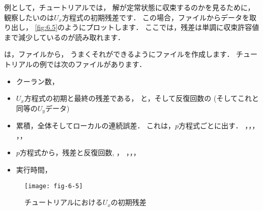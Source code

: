 例として，チュートリアルでは，
解が定常状態に収束するのかを見るために，
観察したいのは$U_{x}$方程式の初期残差です．
この場合，ファイルからデータを取り出し，
\autoref{fig:6.5}のようにプロットします．
ここでは，残差は単調に収束許容値まで減少しているのが読み取れます．

は，ファイルから，
うまくそれができるようにファイルを作成します．
チュートリアルの例では次のファイルがあります．
\begin{itemize}
 \item クーラン数，
 \item $U_{x}$方程式の初期と最終の残差である，
       と，そして反復回数の
        (そしてこれと同等の$U_{y}$データ)
 \item 累積，全体そしてローカルの連続誤差．
       これは，$p$方程式ごとに出す．
       ，，，
       ，，
 \item $p$方程式から，残差と反復回数, ，
       ，，，
 \item 実行時間，
\end{itemize}


\begin{figure}[ht]
 \texttt{[image: fig-6-5]}
 \caption{チュートリアルにおける$U_{x}$の初期残差}
 \label{fig:6.5}
\end{figure}
